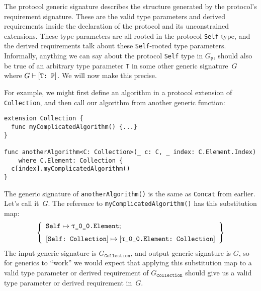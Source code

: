 \documentclass[../generics]{subfiles}
\begin{document}
The protocol generic signature describes the structure generated by the protocol's requirement signature. These are the valid type parameters and derived requirements inside the declaration of the protocol and its unconstrained extensions. These type parameters are all rooted in the protocol \texttt{Self} type, and the derived requirements talk about these \texttt{Self}-rooted type parameters. Informally, anything we can say about the protocol \texttt{Self} type in $G_\texttt{P}$, should also be true of an arbitrary type parameter \texttt{T} in some other generic signature~$G$ where $G\vdash[\texttt{T:~P}]$. We will now make this precise.

For example, we might first define an algorithm in a protocol extension of \texttt{Collection}, and then call our algorithm from another generic function:
\begin{Verbatim}
extension Collection {
  func myComplicatedAlgorithm() {...}
}

func anotherAlgorithm<C: Collection>(_ c: C, _ index: C.Element.Index)
    where C.Element: Collection {
  c[index].myComplicatedAlgorithm()
}
\end{Verbatim}
The generic signature of \texttt{anotherAlgorithm()} is the same as \texttt{Concat} from earlier. Let's call it~$G$. The reference to \texttt{myComplicatedAlgorithm()} has this substitution map:
\[
\SubstMapLongC{\SubstType{Self}{\rT.Element}}{\SubstConf{Self}{\rT.Element}{Collection}}
\]
The input generic signature is $G_\texttt{Collection}$, and output generic signature is $G$, so for generics to ``work'' we would expect that applying this substitution map to a valid type parameter or derived requirement of $G_\texttt{Collection}$ should give us a valid type parameter or derived requirement in~$G$.
\end{document}
